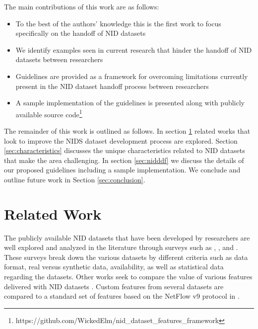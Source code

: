 \documentclass[sigconf]{acmart}
\begin{document}
The main contributions of this work are as follows:

\begin{itemize}
    \item To the best of the authors' knowledge this is the first work to focus specifically on the handoff of NID datasets %
    \item We identify examples seen in current research that hinder the handoff of NID datasets between researchers
    \item Guidelines are provided as a framework for overcoming limitations currently present in the NID dataset handoff process between researchers
    \item A sample implementation of the guidelines is presented along with publicly available source code\footnote{https://github.com/WickedElm/nid\_dataset\_features\_framework}
\end{itemize}

The remainder of this work is outlined as follows.
In section \ref{sec:related_work} related works that look to improve the NIDS dataset development process are explored.
Section \ref{sec:characteristics} discusses the unique characteristics related to NID datasets that make the area challenging.
In section \ref{sec:nidddf} we discuss the details of our proposed guidelines including a sample implementation.
We conclude and outline future work in Section \ref{sec:conclusion}.

\section{Related Work}\label{sec:related_work}

The publicly available NID datasets that have been developed by researchers are well explored and analyzed in the literature through surveys such as \cite{Chou2022}, \cite{ring2019survey}, and \cite{yang2022systematic}.
These surveys break down the various datasets by different criteria such as data format, real versus synthetic data, availability, as well as statistical data regarding the datasets.
Other works seek to compare the value of various features delivered with NID datasets \cite{7809531}.
Custom features from several datasets are compared to a standard set of features based on the NetFlow v9 protocol \cite{netflowv9format} in \cite{sarhan2020netflow}.
\end{document}
